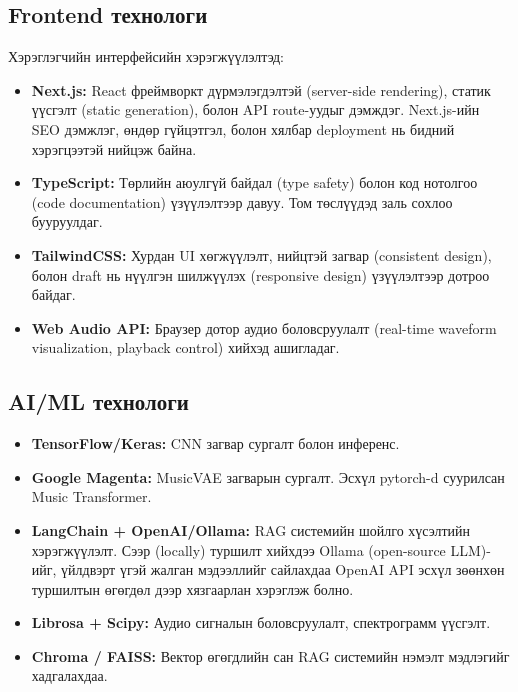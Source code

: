 \subsection{Frontend технологи}

Хэрэглэгчийн интерфейсийн хэрэгжүүлэлтэд:

\begin{itemize}
    \item \textbf{Next.js:} React фреймворкт дүрмэлэгдэлтэй (server-side rendering), статик үүсгэлт (static generation), болон API route-уудыг дэмждэг. Next.js-ийн SEO дэмжлэг, өндөр гүйцэтгэл, болон хялбар deployment нь бидний хэрэгцээтэй нийцэж байна.
    
    \item \textbf{TypeScript:} Төрлийн аюулгүй байдал (type safety) болон код нотолгоо (code documentation) үзүүлэлтээр давуу. Том төслүүдэд заль сохлоо бууруулдаг.
    
    \item \textbf{TailwindCSS:} Хурдан UI хөгжүүлэлт, нийцтэй загвар (consistent design), болон draft нь нүүлгэн шилжүүлэх (responsive design) үзүүлэлтээр дотроо байдаг.
    
    \item \textbf{Web Audio API:} Браузер дотор аудио боловсруулалт (real-time waveform visualization, playback control) хийхэд ашигладаг.
\end{itemize}

\subsection{AI/ML технологи}

\begin{itemize}
    \item \textbf{TensorFlow/Keras:} CNN загвар сургалт болон инференс.
    
    \item \textbf{Google Magenta:} MusicVAE загварын сургалт. Эсхүл pytorch-d суурилсан Music Transformer.
    
    \item \textbf{LangChain + OpenAI/Ollama:} RAG системийн шойлго хүсэлтийн хэрэгжүүлэлт. Сээр (locally) туршилт хийхдээ Ollama (open-source LLM)-ийг, үйлдвэрт үгэй жалган мэдээллийг сайлахдаа OpenAI API эсхүл зөөнхөн туршилтын өгөгдөл дээр хязгаарлан хэрэглэж болно.
    
    \item \textbf{Librosa + Scipy:} Аудио сигналын боловсруулалт, спектрограмм үүсгэлт.
    
    \item \textbf{Chroma / FAISS:} Вектор өгөгдлийн сан RAG системийн нэмэлт мэдлэгийг хадгалахдаа.
\end{itemize}

